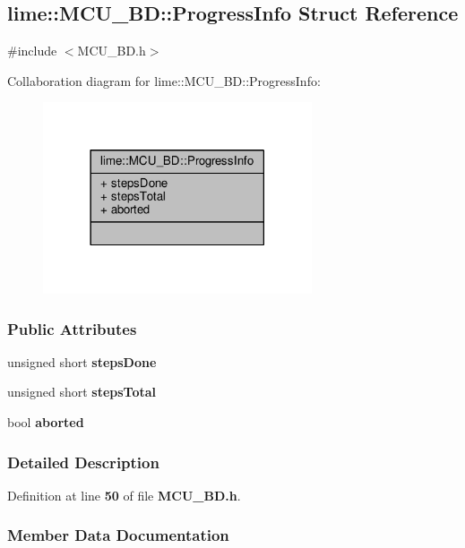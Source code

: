 \subsection{lime\+:\+:M\+C\+U\+\_\+\+BD\+:\+:Progress\+Info Struct Reference}
\label{structlime_1_1MCU__BD_1_1ProgressInfo}


{\ttfamily \#include $<$M\+C\+U\+\_\+\+B\+D.\+h$>$}



Collaboration diagram for lime\+:\+:M\+C\+U\+\_\+\+BD\+:\+:Progress\+Info\+:
\nopagebreak
\begin{figure}[H]
\begin{center}
\leavevmode
\includegraphics[width=225pt]{d5/d11/structlime_1_1MCU__BD_1_1ProgressInfo__coll__graph}
\end{center}
\end{figure}
\subsubsection*{Public Attributes}
\begin{DoxyCompactItemize}
\item 
unsigned short {\bf steps\+Done}
\item 
unsigned short {\bf steps\+Total}
\item 
bool {\bf aborted}
\end{DoxyCompactItemize}


\subsubsection{Detailed Description}


Definition at line {\bf 50} of file {\bf M\+C\+U\+\_\+\+B\+D.\+h}.



\subsubsection{Member Data Documentation}
